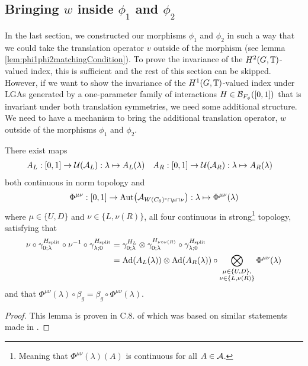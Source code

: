 \documentclass[11pt,a4paper,twoside]{article}
\numberwithin{equation}{section}
\begin{document}
	\subsection{Bringing \texorpdfstring{$w$}{} inside \texorpdfstring{$\phi_1$}{} and \texorpdfstring{$\phi_2$}{}}
	In the last section, we constructed our morphisms $\phi_1$ and $\phi_2$ in such a way that we could take the translation operator $v$ outside of the morphism (see lemma \ref{lem:phi1phi2matchingCondition}). To prove the invariance of the $H^2(G,\TT)$-valued index, this is sufficient and the rest of this section can be skipped. However, if we want to show the invariance of the $H^1(G,\TT)$-valued index under LGAs generated by a one-parameter family of interactions $H\in\BB_{F_\phi}([0,1])$ that is invariant under both translation symmetries, we need some additional structure. We need to have a mechanism to bring the additional translation operator, $w$ outside of the morphisms $\phi_1$ and $\phi_2$.
	\begin{lemma}\label{lem:TranslatingSplittedTimeEvolution}
		There exist maps
		\begin{align}
			A_L&:[0,1]\rightarrow \UU(\AA_L):\lambda\mapsto A_{L}(\lambda)&A_R&:[0,1]\rightarrow \UU(\AA_R):\lambda\mapsto A_{R}(\lambda)
		\end{align}
		both continuous in norm topology and
		\begin{align}
			\Phi^{\mu\nu}:[0,1]\rightarrow\Aut{\AA_{W(C_\theta)^c\cap\mu\cap\nu}}:\lambda\mapsto \Phi^{\mu\nu}(\lambda)
		\end{align}
		where $\mu\in\{U,D\}$ and $\nu\in\{L,\nu(R)\}$, all four continuous in strong\footnote{Meaning that $\Phi^{\mu\nu}(\lambda)(A)$ is continuous for all $A\in\AA$.} topology, satisfying that
		\begin{align}
			\nu\circ\gamma^{\Hsplit}_{0;\lambda}\circ\nu^{-1}\circ\gamma^{\Hsplit}_{\lambda;0}&=\gamma^{H_L}_{0;\lambda}\otimes\gamma^{H_{\nu\circ\nu(R)}}_{0;\lambda}\circ\gamma^{\Hsplit}_{\lambda;0}\\
			\label{eq:TranslatingSplittedTimeEvolution}
			&=\Ad{A_L(\lambda)}\otimes\Ad{A_R(\lambda)}\circ\bigotimes_{\substack{\mu\in\{U,D\},\\\nu\in\{L,\nu(R)\}}}\Phi^{\mu\nu}(\lambda)
		\end{align}
		and that $\Phi^{\mu\nu}(\lambda)\circ\beta_g=\beta_g\circ\Phi^{\mu\nu}(\lambda)$.
	\end{lemma}
	\begin{proof}
		This lemma is proven in C.8. of \cite{jappens2023spt} which was based on similar statements made in \cite{ogata2021h3gmathbb}.
	\end{proof}
\end{document}
